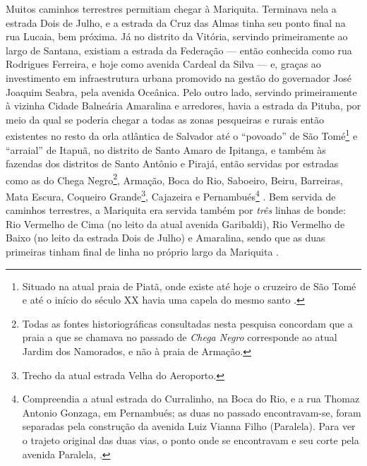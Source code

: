 Muitos caminhos terrestres permitiam chegar à Mariquita. Terminava nela a estrada Dois de Julho, e a estrada da Cruz das Almas tinha seu ponto final na rua Lucaia, bem próxima. Já no distrito da Vitória, servindo primeiramente ao largo de Santana, existiam a estrada da Federação --- então conhecida como rua Rodrigues Ferreira, e hoje como avenida Cardeal da Silva --- e, graças ao investimento em infraestrutura urbana promovido na gestão do governador José Joaquim Seabra, pela avenida Oceânica. Pelo outro lado, servindo primeiramente à vizinha Cidade Balneária Amaralina e arredores, havia a estrada da Pituba, por meio da qual se poderia chegar a todas as zonas pesqueiras e rurais então existentes no resto da orla atlântica de Salvador até o ``povoado'' de São Tomé\footnote{Situado na atual praia de Piatã, onde existe até hoje o cruzeiro de São Tomé e até o início do século XX havia uma capela do mesmo santo \cite{silva_cidade_1957}.} e ``arraial'' de Itapuã, no distrito de Santo Amaro de Ipitanga, e também às fazendas dos distritos de Santo Antônio e Pirajá, então servidas por estradas como as do Chega Negro\footnote{Todas as fontes historiográficas consultadas nesta pesquisa concordam que a praia a que se chamava no passado de \textit{Chega Negro} corresponde ao atual Jardim dos Namorados, e não à praia de Armação.}, Armação, Boca do Rio, Saboeiro, Beiru, Barreiras, Mata Escura, Coqueiro Grande\footnote{Trecho da atual estrada Velha do Aeroporto.}, Cajazeira e Pernambués\footnote{Compreendia a atual estrada do Curralinho, na Boca do Rio, e a rua Thomaz Antonio Gonzaga, em Pernambués; as duas no passado encontravam-se, foram separadas pela construção da avenida Luiz Vianna Filho (Paralela). Para ver o trajeto original das duas vias, o ponto onde se encontravam e seu corte pela avenida Paralela, .} \cite{souza_guia_1935}. Bem servida de caminhos terrestres, a Mariquita era servida também por \textit{três} linhas de bonde: Rio Vermelho de Cima (no leito da atual avenida Garibaldi), Rio Vermelho de Baixo (no leito da estrada Dois de Julho) e Amaralina, sendo que as duas primeiras tinham final de linha no próprio largo da Mariquita \cite{souza_guia_1935,stiel_historia_1984}.


